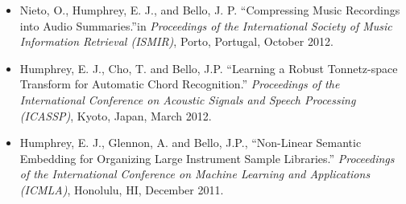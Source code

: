\begin{itemize}
\item Nieto, O.,  Humphrey, E. J., and Bello, J. P. ``Compressing Music Recordings into Audio Summaries.''{in \it Proceedings of the International Society of Music Information Retrieval (ISMIR)}, Porto, Portugal, October 2012.

\item Humphrey, E. J., Cho, T. and Bello, J.P. ``Learning a Robust Tonnetz-space Transform for Automatic Chord Recognition.'' {\it Proceedings of the International Conference on Acoustic Signals and Speech Processing (ICASSP)}, Kyoto, Japan, March 2012.

\item Humphrey, E. J., Glennon, A. and Bello, J.P., ``Non-Linear Semantic Embedding for Organizing Large Instrument Sample Libraries.'' {\it Proceedings of the International Conference on Machine Learning and Applications (ICMLA)}, Honolulu, HI, December 2011.

\end{itemize}

